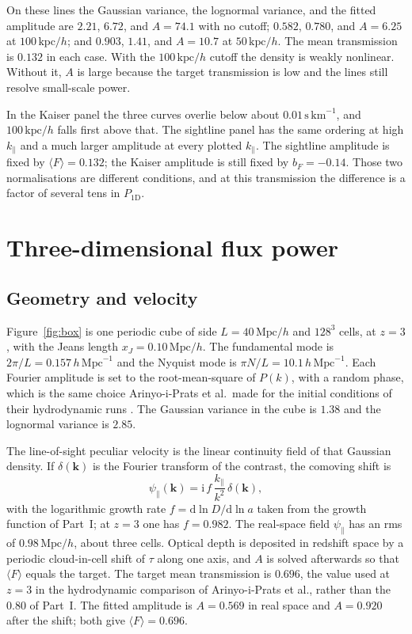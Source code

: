 \documentclass[11pt]{article}
\begin{document}
On these lines the Gaussian variance, the lognormal variance, and the fitted amplitude are $2.21$, $6.72$, and $A=74.1$ with no cutoff; $0.582$, $0.780$, and $A=6.25$ at $100\,\mathrm{kpc}/h$; and $0.903$, $1.41$, and $A=10.7$ at $50\,\mathrm{kpc}/h$.
The mean transmission is $0.132$ in each case.
With the $100\,\mathrm{kpc}/h$ cutoff the density is weakly nonlinear.
Without it, $A$ is large because the target transmission is low and the lines still resolve small-scale power.

In the Kaiser panel the three curves overlie below about $0.01\,\mathrm{s\,km}^{-1}$, and $100\,\mathrm{kpc}/h$ falls first above that.
The sightline panel has the same ordering at high $k_\parallel$ and a much larger amplitude at every plotted $k_\parallel$.
The sightline amplitude is fixed by $\langle F\rangle=0.132$; the Kaiser amplitude is still fixed by $b_F=-0.14$.
Those two normalisations are different conditions, and at this transmission the difference is a factor of several tens in $P_{1\mathrm{D}}$.

\section{Three-dimensional flux power}
\label{sec:box}

\subsection{Geometry and velocity}

Figure~\ref{fig:box} is one periodic cube of side $L=40\,\mathrm{Mpc}/h$ and $128^{3}$ cells, at $z=3$, with the Jeans length $x_J=0.10\,\mathrm{Mpc}/h$.
The fundamental mode is $2\pi/L=0.157\,h\,\mathrm{Mpc}^{-1}$ and the Nyquist mode is $\pi N/L=10.1\,h\,\mathrm{Mpc}^{-1}$.
Each Fourier amplitude is set to the root-mean-square of $P(k)$, with a random phase, which is the same choice Arinyo-i-Prats et al.\ made for the initial conditions of their hydrodynamic runs \citep{Arinyo-i-Prats:2015vqa}.
The Gaussian variance in the cube is $1.38$ and the lognormal variance is $2.85$.

The line-of-sight peculiar velocity is the linear continuity field of that Gaussian density.
If $\delta(\mathbf{k})$ is the Fourier transform of the contrast, the comoving shift is
\begin{equation}
\label{eq:disp}
\psi_\parallel(\mathbf{k})
=
\mathrm{i}\,f\,\frac{k_\parallel}{k^{2}}\,\delta(\mathbf{k}),
\end{equation}
with the logarithmic growth rate $f=\mathrm{d}\ln D/\mathrm{d}\ln a$ taken from the growth function of Part~I; at $z=3$ one has $f=0.982$.
The real-space field $\psi_\parallel$ has an rms of $0.98\,\mathrm{Mpc}/h$, about three cells.
Optical depth is deposited in redshift space by a periodic cloud-in-cell shift of $\tau$ along one axis, and $A$ is solved afterwards so that $\langle F\rangle$ equals the target.
The target mean transmission is $0.696$, the value used at $z=3$ in the hydrodynamic comparison of Arinyo-i-Prats et al., rather than the $0.80$ of Part~I.
The fitted amplitude is $A=0.569$ in real space and $A=0.920$ after the shift; both give $\langle F\rangle=0.696$.
\end{document}
